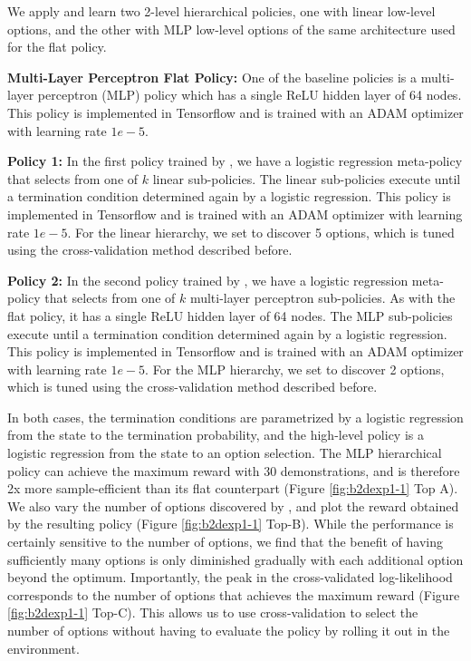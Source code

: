 We apply \alg and learn two 2-level hierarchical policies, one with linear low-level options, and the other with MLP low-level options of the same architecture used for the flat policy. 

\vspace{0.25em}\noindent \textbf{Multi-Layer Perceptron Flat Policy: } One of the baseline policies is a multi-layer perceptron (MLP) policy which has a single ReLU hidden layer of 64 nodes.
This policy is implemented in Tensorflow and is trained with an ADAM optimizer with learning rate $1e-5$.

\vspace{0.25em}\noindent \textbf{\alg Policy 1: } In the first policy trained by \alg, we have a logistic regression meta-policy that selects from one of $k$ linear sub-policies. The linear sub-policies execute until a termination condition determined again by a logistic regression. This policy is implemented in Tensorflow and is trained with an ADAM optimizer with learning rate $1e-5$. For the linear hierarchy, we set \alg to discover 5 options, which is tuned using the cross-validation method described before.

\vspace{0.25em}\noindent \textbf{\alg Policy 2: } In the second policy trained by \alg, we have a logistic regression meta-policy that selects from one of $k$ multi-layer perceptron sub-policies. 
As with the flat policy, it has a single ReLU hidden layer of 64 nodes.
The MLP sub-policies execute until a termination condition determined again by a logistic regression. This policy is implemented in Tensorflow and is trained with an ADAM optimizer with learning rate $1e-5$. For the MLP hierarchy, we set \alg to discover 2 options, which is tuned using the cross-validation method described before.

In both cases, the termination conditions are parametrized by a logistic regression from the state to the termination probability, and the high-level policy is a logistic regression from the state to an option selection.
The MLP hierarchical policy can achieve the maximum reward with  30 demonstrations, and is therefore 2x more sample-efficient than its flat counterpart (Figure \ref{fig:b2dexp1-1} Top A).
We also vary the number of options discovered by \alg, and plot the reward obtained by the resulting policy (Figure \ref{fig:b2dexp1-1} Top-B). While the performance is certainly sensitive to the number of options, we find that the benefit of having sufficiently many options is only diminished gradually with each additional option beyond the optimum. Importantly, the peak in the cross-validated log-likelihood corresponds to the number of options that achieves the maximum reward (Figure \ref{fig:b2dexp1-1} Top-C). This allows us to use cross-validation to select the number of options without having to evaluate the policy by rolling it out in the environment.

